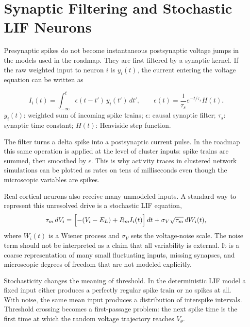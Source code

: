 \section{Synaptic Filtering and Stochastic LIF Neurons}
\label{sec:stochastic-lif}

Presynaptic spikes do not become instantaneous postsynaptic voltage jumps in
the models used in the roadmap. They are first filtered by a synaptic kernel.
If the raw weighted input to neuron $i$ is $y_i(t)$, the current entering the
voltage equation can be written as
%
\begin{keyequation}
\begin{equation}
  I_i(t)
  =
  \int_{-\infty}^{t} \epsilon(t-t')\,y_i(t')\,dt',
  \qquad
  \epsilon(t)=\frac{1}{\tau_s}e^{-t/\tau_s}H(t).
  \label{eq:ch03-filtered-current}
\end{equation}
\tcblower
$y_i(t)$: weighted sum of incoming spike trains; $\epsilon$: causal synaptic
filter; $\tau_s$: synaptic time constant; $H(t)$: Heaviside step function.
\end{keyequation}

\noindent The filter turns a delta spike into a postsynaptic current pulse. In
the roadmap this same operation is applied at the level of cluster inputs:
spike trains are summed, then smoothed by $\epsilon$. This is why activity
traces in clustered network simulations can be plotted as rates on tens of
milliseconds even though the microscopic variables are spikes.

Real cortical neurons also receive many unmodeled inputs. A standard way to
represent this unresolved drive is a stochastic LIF equation,
%
\begin{equation}
  \tau_m\,dV_i
  =
  \Bigl[-(V_i-E_L)+R_m I_i(t)\Bigr]\,dt
  + \sigma_V\sqrt{\tau_m}\,dW_i(t),
  \label{eq:ch03-stochastic-lif}
\end{equation}
%
where $W_i(t)$ is a Wiener process and $\sigma_V$ sets the voltage-noise scale.
The noise term should not be interpreted as a claim that all variability is
external. It is a coarse representation of many small fluctuating inputs, missing
synapses, and microscopic degrees of freedom that are not modeled explicitly.

Stochasticity changes the meaning of threshold. In the deterministic LIF model
a fixed input either produces a perfectly regular spike train or no spikes at
all. With noise, the same mean input produces a distribution of interspike
intervals. Threshold crossing becomes a first-passage problem: the next spike
time is the first time at which the random voltage trajectory reaches
$V_\theta$.

